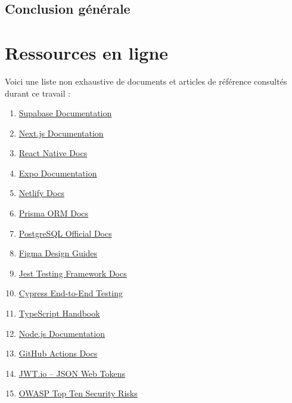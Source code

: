 \documentclass[12pt,a4paper]{report}
\begin{document}
\section*{Conclusion générale}


\chapter*{Ressources en ligne}
Voici une liste non exhaustive de documents et articles de référence consultés durant ce travail :

\begin{enumerate}[label=\arabic*., leftmargin=*]
  \item \href{https://supabase.com/docs}{Supabase Documentation}\label{res:supabase}
  \item \href{https://nextjs.org/docs}{Next.js Documentation}\label{res:nextjs}
  \item \href{https://reactnative.dev/docs/getting-started}{React Native Docs}\label{res:reactnative}
  \item \href{https://docs.expo.dev}{Expo Documentation}\label{res:expo}
  \item \href{https://docs.netlify.com}{Netlify Docs}\label{res:netlify}
  \item \href{https://www.prisma.io/docs}{Prisma ORM Docs}\label{res:prisma}
  \item \href{https://www.postgresql.org/docs/}{PostgreSQL Official Docs}\label{res:postgresql}
  \item \href{https://figma.com/resources/learn-design}{Figma Design Guides}\label{res:figma}
  \item \href{https://jestjs.io/docs}{Jest Testing Framework Docs}\label{res:jest}
  \item \href{https://docs.cypress.io}{Cypress End-to-End Testing}\label{res:cypress}
  \item \href{https://www.typescriptlang.org/docs}{TypeScript Handbook}\label{res:typescript}
  \item \href{https://nodejs.org/en/docs}{Node.js Documentation}\label{res:node}
  \item \href{https://docs.github.com/en/actions}{GitHub Actions Docs}\label{res:githubactions}
  \item \href{https://jwt.io/introduction}{JWT.io – JSON Web Tokens}\label{res:jwt}
  \item \href{https://owasp.org/www-project-top-ten/}{OWASP Top Ten Security Risks}\label{res:owasp}

\end{enumerate}
\end{document}
